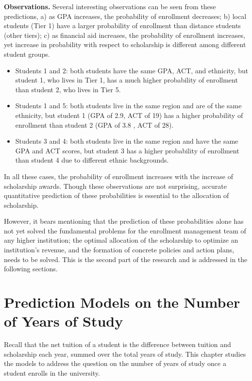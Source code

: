 \documentclass[12pt,english]{report}
\begin{document}
\vspace{0.15in}
\noindent \textbf{Observations.} Several interesting observations can be seen from these predictions, a) as GPA  increases, the probability of enrollment decreases; b) local students (Tier 1)  have a larger probability of enrollment than distance students (other tiers);  c) as financial aid increases, the probability of enrollment increases, yet  increase in probability with respect to scholarship is different among  different student groups.

\begin{itemize}
\item	Students 1 and 2: both students have the same GPA, ACT, and ethnicity, but student 1, who lives in Tier 1, has a much higher probability of enrollment than student 2, who lives in Tier 5.
\item Students 1 and 5: both students live in the same region and are of the same ethnicity, but student 1 (GPA of 2.9, ACT of 19) has a higher probability of enrollment than student 2 (GPA of 3.8 , ACT of 28).
\item Students 3 and 4: both students live in the same region and have the same GPA and ACT scores, but student 3 has a higher probability of enrollment than student 4 due to different ethnic backgrounds.
\end{itemize}

In all these cases, the probability of enrollment increases with the increase of scholarship awards. Though these observations are not surprising, accurate  quantitative prediction of these probabilities is essential to the allocation  of scholarship.

However, it  bears mentioning that the prediction of these probabilities alone  has not yet solved the fundamental problems for the enrollment management team  of any higher institution;  the optimal allocation of the scholarship to  optimize an institution's revenue, and the formation of concrete policies and  action plans,  needs to be solved. This is the second part of the research and  is addressed in the following sections.


\chapter {Prediction Models on the Number of Years of Study}
Recall that the net tuition of a student is the difference between  tuition and  scholarship each year, summed over the total years of study.    This chapter studies the models to address the question on the number of years of study once a student enrolls in the university. 
% 
% 
\end{document}

